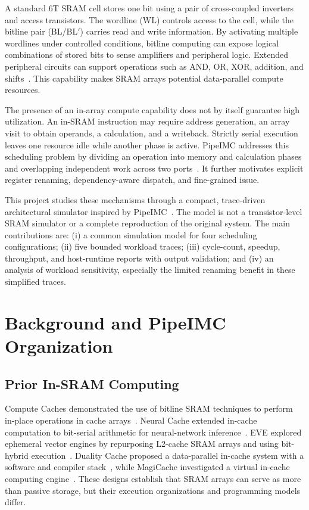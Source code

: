 \documentclass[conference]{IEEEtran}
\begin{document}
A standard 6T SRAM cell stores one bit using a pair of cross-coupled inverters and access transistors. The wordline (WL) controls access to the cell, while the bitline pair (BL/BL$'$) carries read and write information. By activating multiple wordlines under controlled conditions, bitline computing can expose logical combinations of stored bits to sense amplifiers and peripheral logic. Extended peripheral circuits can support operations such as AND, OR, XOR, addition, and shifts~\cite{aga,neural}. This capability makes SRAM arrays potential data-parallel compute resources.

The presence of an in-array compute capability does not by itself guarantee high utilization. An in-SRAM instruction may require address generation, an array visit to obtain operands, a calculation, and a writeback. Strictly serial execution leaves one resource idle while another phase is active. PipeIMC addresses this scheduling problem by dividing an operation into memory and calculation phases and overlapping independent work across two ports~\cite{pipeimc}. It further motivates explicit register renaming, dependency-aware dispatch, and fine-grained issue.

This project studies these mechanisms through a compact, trace-driven architectural simulator inspired by PipeIMC~\cite{pipeimc}. The model is not a transistor-level SRAM simulator or a complete reproduction of the original system. The main contributions are: (i) a common simulation model for four scheduling configurations; (ii) five bounded workload traces; (iii) cycle-count, speedup, throughput, and host-runtime reports with output validation; and (iv) an analysis of workload sensitivity, especially the limited renaming benefit in these simplified traces.

\section{Background and PipeIMC Organization}
\subsection{Prior In-SRAM Computing}
Compute Caches demonstrated the use of bitline SRAM techniques to perform in-place operations in cache arrays~\cite{aga}. Neural Cache extended in-cache computation to bit-serial arithmetic for neural-network inference~\cite{neural}. EVE explored ephemeral vector engines by repurposing L2-cache SRAM arrays and using bit-hybrid execution~\cite{eve}. Duality Cache proposed a data-parallel in-cache system with a software and compiler stack~\cite{duality}, while MagiCache investigated a virtual in-cache computing engine~\cite{magicache}. These designs establish that SRAM arrays can serve as more than passive storage, but their execution organizations and programming models differ.
\end{document}
